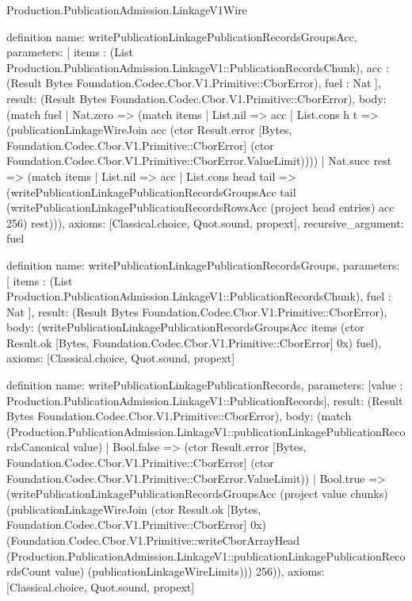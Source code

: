 \begin{lexlean}{Production.PublicationAdmission.LinkageV1Wire}
\begin{semanticmodule}
definition{
  name: writePublicationLinkagePublicationRecordsGroupsAcc,
  parameters: [
    items : (List Production.PublicationAdmission.LinkageV1::PublicationRecordsChunk),
    acc : (Result Bytes Foundation.Codec.Cbor.V1.Primitive::CborError),
    fuel : Nat
  ],
  result: (Result Bytes Foundation.Codec.Cbor.V1.Primitive::CborError),
  body: (match fuel
    | Nat.zero => (match items
      | List.nil => acc
      | List.cons h t => (publicationLinkageWireJoin acc (ctor Result.error [Bytes, Foundation.Codec.Cbor.V1.Primitive::CborError] (ctor Foundation.Codec.Cbor.V1.Primitive::CborError.ValueLimit))))
    | Nat.succ rest => (match items
      | List.nil => acc
      | List.cons head tail => (writePublicationLinkagePublicationRecordsGroupsAcc tail (writePublicationLinkagePublicationRecordsRowsAcc (project head entries) acc 256) rest))),
  axioms: [Classical.choice, Quot.sound, propext],
  recursive_argument: fuel
}

definition{
  name: writePublicationLinkagePublicationRecordsGroups,
  parameters: [
    items : (List Production.PublicationAdmission.LinkageV1::PublicationRecordsChunk),
    fuel : Nat
  ],
  result: (Result Bytes Foundation.Codec.Cbor.V1.Primitive::CborError),
  body: (writePublicationLinkagePublicationRecordsGroupsAcc items (ctor Result.ok [Bytes, Foundation.Codec.Cbor.V1.Primitive::CborError] 0x) fuel),
  axioms: [Classical.choice, Quot.sound, propext]
}

definition{
  name: writePublicationLinkagePublicationRecords,
  parameters: [value : Production.PublicationAdmission.LinkageV1::PublicationRecords],
  result: (Result Bytes Foundation.Codec.Cbor.V1.Primitive::CborError),
  body: (match (Production.PublicationAdmission.LinkageV1::publicationLinkagePublicationRecordsCanonical value)
    | Bool.false => (ctor Result.error [Bytes, Foundation.Codec.Cbor.V1.Primitive::CborError] (ctor Foundation.Codec.Cbor.V1.Primitive::CborError.ValueLimit))
    | Bool.true => (writePublicationLinkagePublicationRecordsGroupsAcc (project value chunks) (publicationLinkageWireJoin (ctor Result.ok [Bytes, Foundation.Codec.Cbor.V1.Primitive::CborError] 0x) (Foundation.Codec.Cbor.V1.Primitive::writeCborArrayHead (Production.PublicationAdmission.LinkageV1::publicationLinkagePublicationRecordsCount value) (publicationLinkageWireLimits))) 256)),
  axioms: [Classical.choice, Quot.sound, propext]
}


\end{semanticmodule}
\end{lexlean}
